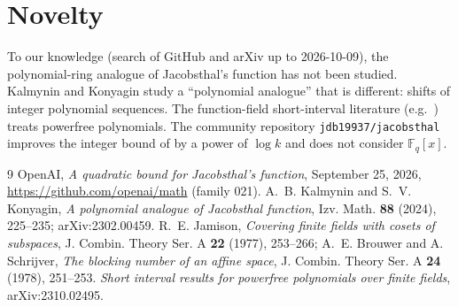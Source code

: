 \documentclass[11pt]{amsart}
\theoremstyle{remark}
\newcommand{\F}{\mathbb F}
\begin{document}
\section*{Novelty}
To our knowledge (search of GitHub and arXiv up to 2026-10-09), the polynomial-ring analogue of
Jacobsthal's function has not been studied. Kalmynin and Konyagin \cite{KK} study a
``polynomial analogue'' that is different: shifts of integer polynomial sequences. The function-field
short-interval literature (e.g.\ \cite{powerfree}) treats powerfree polynomials. The community
repository \texttt{jdb19937/jacobsthal} improves the integer bound of \cite{oai} by a power of
$\log k$ and does not consider $\F_q[x]$.

\begin{thebibliography}{9}
 OpenAI, \emph{A quadratic bound for Jacobsthal's function}, September 25, 2026,
\url{https://github.com/openai/math} (family 021).
 A.~B. Kalmynin and S.~V. Konyagin, \emph{A polynomial analogue of Jacobsthal function},
Izv. Math. \textbf{88} (2024), 225--235; arXiv:2302.00459.
 R.~E. Jamison, \emph{Covering finite fields with cosets of subspaces}, J. Combin. Theory
Ser. A \textbf{22} (1977), 253--266; A.~E. Brouwer and A. Schrijver, \emph{The blocking number of an
affine space}, J. Combin. Theory Ser. A \textbf{24} (1978), 251--253.
 \emph{Short interval results for powerfree polynomials over finite fields},
arXiv:2310.02495.
\end{thebibliography}
\end{document}
